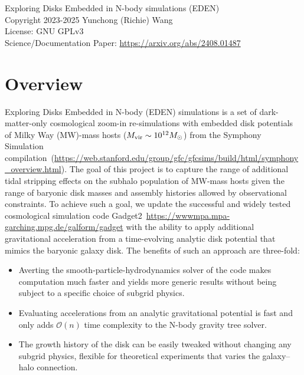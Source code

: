 \documentclass[12pt]{article}
\begin{document}
	\vspace{-1ex}
	\noindent{}Exploring Disks Embedded in N-body simulations (EDEN) \\
    \noindent{}Copyright \textcopyright{}2023-2025 Yunchong (Richie) Wang\\
    \noindent{}License: GNU GPLv3\\
	\noindent{}Science/Documentation Paper: \url{https://arxiv.org/abs/2408.01487}\\
	
	\tableofcontents
	\newcommand{\ttt}[1]{\texttt{#1}}
	
	\section{Overview}
	
	Exploring Disks Embedded in N-body (EDEN) simulations is a set of dark-matter-only cosmological zoom-in re-simulations with embedded disk potentials of Milky Way (MW)-mass hosts ($M_{\rm vir} \sim 10^{12}M_{\odot}$) from the Symphony Simulation compilation~(\url{https://web.stanford.edu/group/gfc/gfcsims/build/html/symphony_overview.html}). The goal of this project is to capture the range of additional tidal stripping effects on the subhalo population of MW-mass hosts given the range of baryonic disk masses and assembly histories allowed by observational constraints. To achieve such a goal, we update the successful and widely tested cosmological simulation code Gadget2~\url{https://wwwmpa.mpa-garching.mpg.de/galform/gadget} with the ability to apply additional gravitational acceleration from a time-evolving analytic disk potential that mimics the baryonic galaxy disk. The benefits of such an approach are three-fold: 
    \begin{itemize}
        \item Averting the smooth-particle-hydrodynamics solver of the code makes computation much faster and yields more generic results without being subject to a specific choice of subgrid physics.
        \item Evaluating accelerations from an analytic gravitational potential is fast and only adds $\mathcal{O}(n)$ time complexity to the N-body gravity tree solver.
        \item The growth history of the disk can be easily tweaked without changing any subgrid physics, flexible for theoretical experiments that varies the galaxy--halo connection.
    \end{itemize}
    
\end{document}
